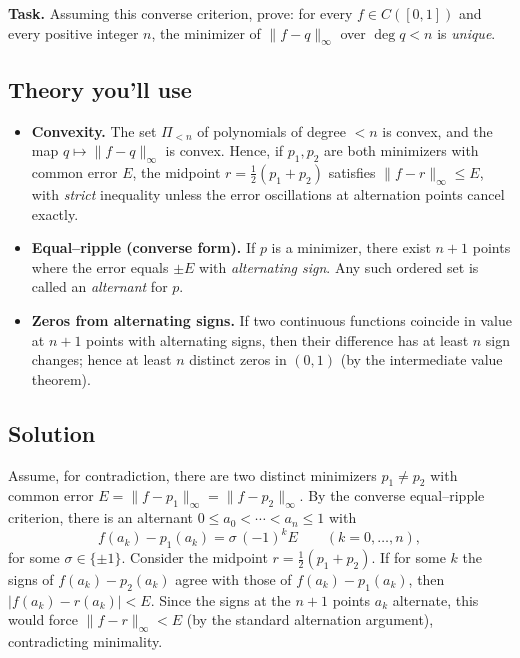 \documentclass[12pt,a4paper]{article}
\theoremstyle{plain}
\theoremstyle{definition}
\theoremstyle{remark}
\theoremstyle{remark}
\begin{document}
\smallskip
\noindent
\textbf{Task.} Assuming this converse criterion, prove: for every $f\in C([0,1])$ and every positive integer $n$,
the minimizer of $\|f-q\|_\infty$ over $\deg q<n$ is \emph{unique}.


\subsection*{Theory you’ll use}

\begin{itemize}\setlength{\itemsep}{0.6em}
	\item \textbf{Convexity.}
	The set $\Pi_{<n}$ of polynomials of degree $<n$ is convex, and the map
	$q\mapsto \|f-q\|_\infty$ is convex.
	Hence, if $p_1,p_2$ are both minimizers with common error $E$, the midpoint
	$r=\tfrac12(p_1+p_2)$ satisfies $\|f-r\|_\infty\le E$,
	with \emph{strict} inequality unless the error oscillations at alternation points
	cancel exactly.
	
	\item \textbf{Equal--ripple (converse form).}
	If $p$ is a minimizer, there exist $n+1$ points where the error equals $\pm E$
	with \emph{alternating sign}. Any such ordered set is called an \emph{alternant} for $p$.
	
	\item \textbf{Zeros from alternating signs.}
	If two continuous functions coincide in value at $n+1$ points with alternating signs,
	then their difference has at least $n$ sign changes; hence at least $n$ distinct zeros
	in $(0,1)$ (by the intermediate value theorem).
\end{itemize}

\smallskip

\subsection*{Solution}

Assume, for contradiction, there are two distinct minimizers $p_1\ne p_2$ with common error
$E=\|f-p_1\|_\infty=\|f-p_2\|_\infty$. By the converse equal–ripple criterion, there is an alternant
$0\le a_0<\cdots<a_n\le 1$ with
\[
f(a_k)-p_1(a_k)=\sigma\,(-1)^k E\qquad (k=0,\dots,n),
\]
for some $\sigma\in\{\pm1\}$. Consider the midpoint $r=\tfrac12(p_1+p_2)$.
If for some $k$ the signs of $f(a_k)-p_2(a_k)$ agree with those of $f(a_k)-p_1(a_k)$, then
$|f(a_k)-r(a_k)|<E$. Since the signs at the $n+1$ points $a_k$ alternate, this would force
$\|f-r\|_\infty<E$ (by the standard alternation argument), contradicting minimality.
\end{document}
